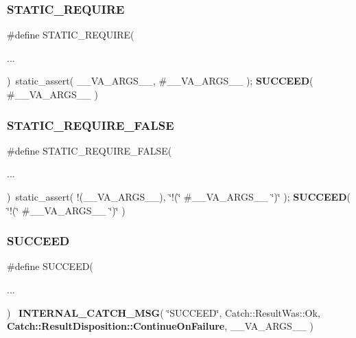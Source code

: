 \subsubsection{STATIC\_REQUIRE}
{\footnotesize\ttfamily \#define S\+T\+A\+T\+I\+C\+\_\+\+R\+E\+Q\+U\+I\+RE(\begin{DoxyParamCaption}\item[{}]{... }\end{DoxyParamCaption})~static\+\_\+assert(   \+\_\+\+\_\+\+V\+A\+\_\+\+A\+R\+G\+S\+\_\+\+\_\+,  \#\+\_\+\+\_\+\+V\+A\+\_\+\+A\+R\+G\+S\+\_\+\+\_\+ ); \textbf{ S\+U\+C\+C\+E\+ED}( \#\+\_\+\+\_\+\+V\+A\+\_\+\+A\+R\+G\+S\+\_\+\+\_\+ )}

\mbox{\label{catch_8hpp_ae7506af68f12e7efdb22e951b911b5a0}} 
\subsubsection{STATIC\_REQUIRE\_FALSE}
{\footnotesize\ttfamily \#define S\+T\+A\+T\+I\+C\+\_\+\+R\+E\+Q\+U\+I\+R\+E\+\_\+\+F\+A\+L\+SE(\begin{DoxyParamCaption}\item[{}]{... }\end{DoxyParamCaption})~static\+\_\+assert( !(\+\_\+\+\_\+\+V\+A\+\_\+\+A\+R\+G\+S\+\_\+\+\_\+), \char`\"{}!(\char`\"{} \#\+\_\+\+\_\+\+V\+A\+\_\+\+A\+R\+G\+S\+\_\+\+\_\+ \char`\"{})\char`\"{} ); \textbf{ S\+U\+C\+C\+E\+ED}( \char`\"{}!(\char`\"{} \#\+\_\+\+\_\+\+V\+A\+\_\+\+A\+R\+G\+S\+\_\+\+\_\+ \char`\"{})\char`\"{} )}

\mbox{\label{catch_8hpp_a8e852a9421caf4fda4e1903d9f02bcf5}} 
\subsubsection{SUCCEED}
{\footnotesize\ttfamily \#define S\+U\+C\+C\+E\+ED(\begin{DoxyParamCaption}\item[{}]{... }\end{DoxyParamCaption})~\textbf{ I\+N\+T\+E\+R\+N\+A\+L\+\_\+\+C\+A\+T\+C\+H\+\_\+\+M\+SG}( \char`\"{}S\+U\+C\+C\+E\+ED\char`\"{}, Catch\+::\+Result\+Was\+::\+Ok, \textbf{ Catch\+::\+Result\+Disposition\+::\+Continue\+On\+Failure}, \+\_\+\+\_\+\+V\+A\+\_\+\+A\+R\+G\+S\+\_\+\+\_\+ )}


